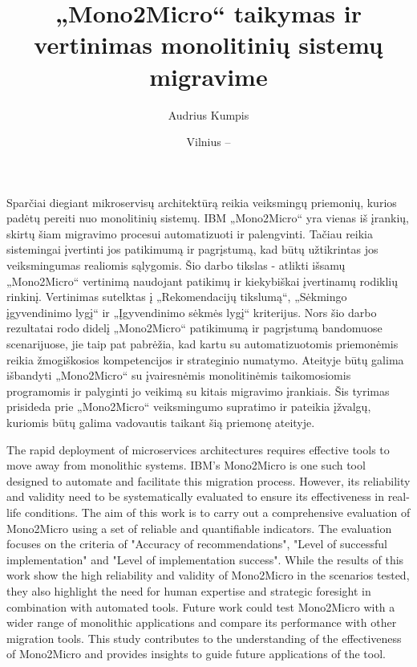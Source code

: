 \documentclass{VUMIFPSbakalaurinis}
\institute{Informatikos institutas}  %
\title{„Mono2Micro“ taikymas ir vertinimas monolitinių sistemų migravime}
\author{Audrius Kumpis}
\date{Vilnius – \the\year}
\begin{document}
\maketitle

Sparčiai diegiant mikroservisų architektūrą reikia veiksmingų priemonių, kurios padėtų pereiti nuo monolitinių sistemų. IBM „Mono2Micro“ yra vienas iš įrankių, skirtų šiam migravimo procesui automatizuoti ir palengvinti. Tačiau reikia sistemingai įvertinti jos patikimumą ir pagrįstumą, kad būtų užtikrintas jos veiksmingumas realiomis sąlygomis. Šio darbo tikslas - atlikti išsamų „Mono2Micro“ vertinimą naudojant patikimų ir kiekybiškai įvertinamų rodiklių rinkinį. Vertinimas sutelktas į „Rekomendacijų tikslumą“, „Sėkmingo įgyvendinimo lygį“ ir „Įgyvendinimo sėkmės lygį“ kriterijus. Nors šio darbo rezultatai rodo didelį „Mono2Micro“ patikimumą ir pagrįstumą bandomuose scenarijuose, jie taip pat pabrėžia, kad kartu su automatizuotomis priemonėmis reikia žmogiškosios kompetencijos ir strateginio numatymo. Ateityje būtų galima išbandyti „Mono2Micro“ su įvairesnėmis monolitinėmis taikomosiomis programomis ir palyginti jo veikimą su kitais migravimo įrankiais. Šis tyrimas prisideda prie „Mono2Micro“ veiksmingumo supratimo ir pateikia įžvalgų, kuriomis būtų galima vadovautis taikant šią priemonę ateityje.

The rapid deployment of microservices architectures requires effective tools to move away from monolithic systems. IBM's Mono2Micro is one such tool designed to automate and facilitate this migration process. However, its reliability and validity need to be systematically evaluated to ensure its effectiveness in real-life conditions. The aim of this work is to carry out a comprehensive evaluation of Mono2Micro using a set of reliable and quantifiable indicators. The evaluation focuses on the criteria of "Accuracy of recommendations", "Level of successful implementation" and "Level of implementation success". While the results of this work show the high reliability and validity of Mono2Micro in the scenarios tested, they also highlight the need for human expertise and strategic foresight in combination with automated tools. Future work could test Mono2Micro with a wider range of monolithic applications and compare its performance with other migration tools. This study contributes to the understanding of the effectiveness of Mono2Micro and provides insights to guide future applications of the tool.
\end{document}
